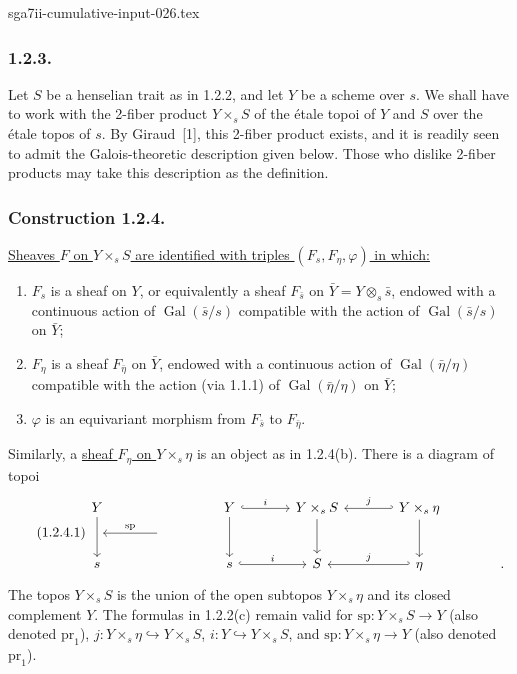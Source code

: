 \begin{filecontents*}{sga7ii-cumulative-input-026.tex}
\subsubsection*{1.2.3.}
Let $S$ be a henselian trait as in 1.2.2, and let $Y$ be a scheme over
$s$.  We shall have to work with the 2-fiber product $Y\times_sS$ of
the \'{e}tale topoi of $Y$ and $S$ over the \'{e}tale topos of $s$.
By Giraud~[1], this 2-fiber product exists, and it is readily seen to
admit the Galois-theoretic description given below.  Those who dislike
2-fiber products may take this description as the definition.

\subsubsection*{Construction 1.2.4.}
\underline{Sheaves $F$ on $Y\times_sS$ are identified with triples
$(F_s,F_\eta,\varphi)$ in which:}
\begin{enumerate}[label=(\alph*)]
\item $F_s$ is a sheaf on $Y$, or equivalently a sheaf $F_{\bar s}$
on $\bar Y=Y\otimes_s\bar s$, endowed with a continuous action of
$\operatorname{Gal}(\bar s/s)$ compatible with the action of
$\operatorname{Gal}(\bar s/s)$ on $\bar Y$;

\item $F_\eta$ is a sheaf $F_{\bar\eta}$ on $\bar Y$, endowed with a
continuous action of $\operatorname{Gal}(\bar\eta/\eta)$ compatible
with the action (via 1.1.1) of $\operatorname{Gal}(\bar\eta/\eta)$ on
$\bar Y$;

\item $\varphi$ is an equivariant morphism from $F_{\bar s}$ to
$F_{\bar\eta}$.
\end{enumerate}
Similarly, a \underline{sheaf $F_\eta$ on $Y\times_s\eta$} is an
object as in 1.2.4(b).  There is a diagram of topoi
\begin{equation}\tag{1.2.4.1}
\begin{tikzcd}[column sep=large, row sep=small]
Y \arrow[dd] & {} & Y \arrow[r, hook, "i"] \arrow[dd]
  & Y\times_sS \arrow[dd]
  & Y\times_s\eta \arrow[l, hook', "j"'] \arrow[dd] & {} \\
{} & {} \arrow[l, "\mathrm{sp}"'] & {} & {} & {} & {} \\
s & {} & s \arrow[r, hook, "i"] & S
  & \eta \arrow[l, hook', "j"'] & {.}
\end{tikzcd}
\end{equation}
The topos $Y\times_sS$ is the union of the open subtopos
$Y\times_s\eta$ and its closed complement $Y$.  The formulas in
1.2.2(c) remain valid for
$\mathrm{sp}:Y\times_sS\longrightarrow Y$ (also denoted
$\mathrm{pr}_1$), $j:Y\times_s\eta\hookrightarrow Y\times_sS$,
$i:Y\hookrightarrow Y\times_sS$, and
$\mathrm{sp}:Y\times_s\eta\longrightarrow Y$ (also denoted
$\mathrm{pr}_1$).


\end{filecontents*}
